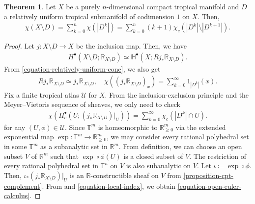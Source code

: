 \documentclass[a4paper,dvipdfmx,reqno,12pt]{amsart}
\theoremstyle{definition}
\newtheorem{theorem}{Theorem}[section]
\newcommand{\deq}{\coloneqq}
\newcommand{\opn}[1]{\operatorname{#1}}
\numberwithin{equation}{section}
\begin{document}
\begin{theorem}
\label{theorem-euler-power}
Let $X$ be a purely $n$-dimensional compact tropical manifold
and $D$ a relatively uniform tropical submanifold of
codimension $1$ on $X$. Then,
\begin{align}
\label{equation-euler-power}
\chi(X\setminus D)=\sum_{k=0}^{n}
\chi(|D^{k}|)=\sum_{k=0}^{n}(k+1)\chi_c(|D^{k}|\setminus
|D^{k+1}|).
\end{align}
\end{theorem}
\begin{proof}
Let $j\colon X\setminus D\to X$ be the inclusion map.
Then, we have 
\begin{align}
H^{\bullet}(X\setminus D;\mathbb{R}_{X\setminus D})
\simeq \mathbb{H}^{\bullet}(X;Rj_*\mathbb{R}_{X\setminus D}).
\end{align}
From \cref{equation-relatively-uniform-cone}, we also get
\begin{align}
\label{equation-local-index}
Rj_*\mathbb{R}_{X\setminus D}\simeq j_*\mathbb{R}_{X\setminus D},
\quad \chi((j_*\mathbb{R}_{X\setminus D})_x)=
\sum_{k=0}^{\infty}1_{|D^{k}|}(x).
\end{align}
Fix a finite tropical atlas $\mathcal{U}$ for $X$.
From the inclusion-exclusion principle and the Meyer--Vietoris
sequence of sheaves, we only need to check
\begin{align}
\label{equation-open-euler-calculus}
\chi(H^{\bullet}_c(U;(j_*\mathbb{R}_{X\setminus D})|_{U}))
=\sum_{k=0}^{\infty}\chi_c(|D^{k}|\cap U).
\end{align}
for any $(U,\phi)\in \mathcal{U}$.
Since $\mathbb{T}^{m}$ is homeomorphic to 
$\mathbb{R}_{\geq 0}^{m}$ via the extended exponential map
$\opn{exp}\colon \mathbb{T}^{m} \to \mathbb{R}_{\geq 0}^{m}$,
we may consider every rational
polyhedral set in some $\mathbb{T}^{m}$ as a
subanalytic set in $\mathbb{R}^{m}$.
From definition, we can choose an open subset $V$ of 
$\mathbb{R}^{m}$ such that $\opn{exp}\circ\phi(U)$ is
a closed subset of $V$.
The restriction of every rational polyhedral set in $\mathbb{T}^{n}$
on $V$ is also subanalytic \cite[Proposition 8.2.2.(iii)]{MR1299726}
on $V$. Let $\iota\deq \opn{exp}\circ \phi$.
Then, $\iota_*(j_*\mathbb{R}_{X\setminus D})|_{U}$
is an $\mathbb{R}$-constructible sheaf on $V$
\cite[Definition 8.4.3]{MR1299726} from \cref{proposition-cpt-complement}.
From \cite[Theorem 9.7.1]{MR1299726} and 
\eqref{equation-local-index}, we obtain
\eqref{equation-open-euler-calculus}.
\end{proof}
\end{document}
